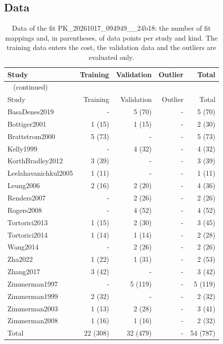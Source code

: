 \subsection{Data}

\begin{longtable}{lrrrr}
\caption{Data of the fit PK\_20261017\_094949\_\_24b18: the number of fit mappings and, in parentheses, of data points per study and kind. The training data enters the cost, the validation data and the outliers are evaluated only.}\label{tab:data:PK_20261017_094949__24b18} \\
\toprule
Study & Training & Validation & Outlier & Total \\
\midrule
\endfirsthead
\multicolumn{5}{l}{\small\tablename~\thetable{} (continued)} \\
\toprule
Study & Training & Validation & Outlier & Total \\
\midrule
\endhead
\bottomrule
\endlastfoot
BasaDenes2019 & - & 5 (70) & - & 5 (70) \\
Bottiger2001 & 1 (15) & 1 (15) & - & 2 (30) \\
Brattstrom2000 & 5 (73) & - & - & 5 (73) \\
Kelly1999 & - & 4 (32) & - & 4 (32) \\
KorthBradley2012 & 3 (39) & - & - & 3 (39) \\
Leelahavanichkul2005 & 1 (11) & - & - & 1 (11) \\
Leung2006 & 2 (16) & 2 (20) & - & 4 (36) \\
Renders2007 & - & 2 (26) & - & 2 (26) \\
Rogers2008 & - & 4 (52) & - & 4 (52) \\
Tortorici2013 & 1 (15) & 2 (30) & - & 3 (45) \\
Tortorici2014 & 1 (14) & 1 (14) & - & 2 (28) \\
Wang2014 & - & 2 (26) & - & 2 (26) \\
Zha2022 & 1 (22) & 1 (31) & - & 2 (53) \\
Zhang2017 & 3 (42) & - & - & 3 (42) \\
Zimmerman1997 & - & 5 (119) & - & 5 (119) \\
Zimmerman1999 & 2 (32) & - & - & 2 (32) \\
Zimmerman2003 & 1 (13) & 2 (28) & - & 3 (41) \\
Zimmerman2008 & 1 (16) & 1 (16) & - & 2 (32) \\
Total & 22 (308) & 32 (479) & - & 54 (787) \\
\end{longtable}

